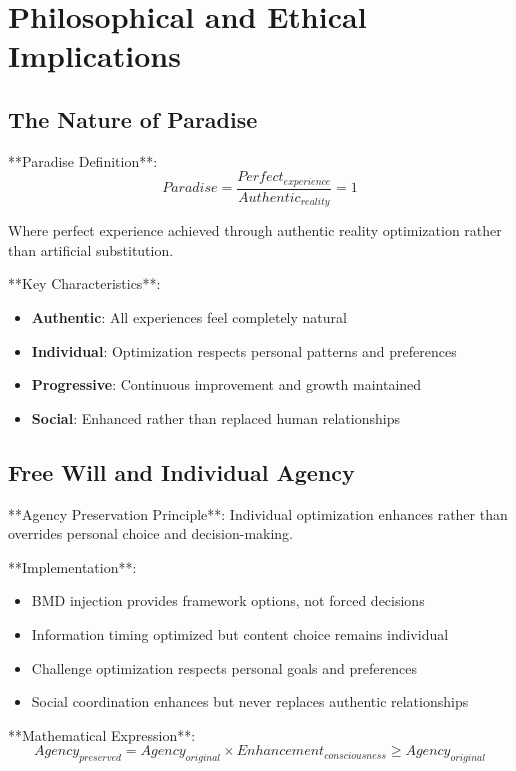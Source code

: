 \documentclass[12pt,a4paper]{article}
\begin{document}
\section{Philosophical and Ethical Implications}

\subsection{The Nature of Paradise}

**Paradise Definition**:
$$Paradise = \frac{Perfect_{experience}}{Authentic_{reality}} = 1$$

Where perfect experience achieved through authentic reality optimization rather than artificial substitution.

**Key Characteristics**:
\begin{itemize}
\item \textbf{Authentic}: All experiences feel completely natural
\item \textbf{Individual}: Optimization respects personal patterns and preferences
\item \textbf{Progressive}: Continuous improvement and growth maintained
\item \textbf{Social}: Enhanced rather than replaced human relationships
\end{itemize}

\subsection{Free Will and Individual Agency}

**Agency Preservation Principle**:
Individual optimization enhances rather than overrides personal choice and decision-making.

**Implementation**:
\begin{itemize}
\item BMD injection provides framework options, not forced decisions
\item Information timing optimized but content choice remains individual
\item Challenge optimization respects personal goals and preferences
\item Social coordination enhances but never replaces authentic relationships
\end{itemize}

**Mathematical Expression**:
$$Agency_{preserved} = Agency_{original} \times Enhancement_{consciousness} \geq Agency_{original}$$
\end{document}

